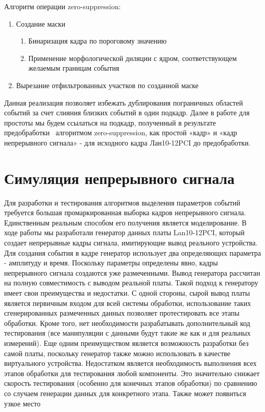 \documentclass[a4paper,14pt]{extreport}
\begin{document}
Алгоритм операции zero-suppression:
\begin{enumerate}
    \item Создание маски
    \begin{enumerate}
        \item Бинаризация кадра по пороговому значению
        \item Применение морфологической диляции с ядром, соответствующем желаемым границам события
    \end{enumerate}
    \item Вырезание отфильтрованных участков по созданной маске
\end{enumerate}

Данная реализация позволяет избежать дублирования пограничных областей событий за счет слияния близких событий в один подкадр. Далее в работе для простоты мы будем ссылаться на подкадр, полученный в результате предобработки ~алгоритмом zero-suppression, как простой «кадр» и «кадр непрерывного сигнала» - для исходного кадра Лан10-12PCI до предобработки.

\section{Симуляция непрерывного сигнала}

Для разработки и тестирования алгоритмов выделения параметров событий требуется большая промаркированная выборка кадров непрерывного сигнала. Единственным реальным способом его получения является моделирование. В ходе работы мы разработали генератор данных платы Lan10-12PCI, который создает непрерывные кадры сигнала, имитирующие вывод реального устройства. Для создания события в кадре генератор использует два определяющих параметра - амплитуду и время. Поскольку параметры определены явно, кадры непрерывного сигнала создаются уже размеченными. Вывод генератора рассчитан на полную совместимость с выводом реальной платы. Такой подход к генератору имеет свои преимущества и недостатки. С одной стороны, сырой вывод платы является первичным входом для всей системы обработки, использование таких сгенерированных размеченных данных позволяет протестировать все этапы обработки. Кроме того, нет необходимости разрабатывать дополнительный код тестирования (все манипуляции с данными будут такие же как и для реальных измерений). Еще одним преимуществом является возможность разработки без самой платы, поскольку генератор также можно использовать в качестве виртуального устройства. Недостатком является необходимость выполнения всех этапов обработки для тестирования любой компоненты. Это значительно снижает скорость тестирования (особенно для конечных этапов обработки) по сравнению со случаем генерации данных для конкретного этапа. Также может появиться узкое место
\end{document}
